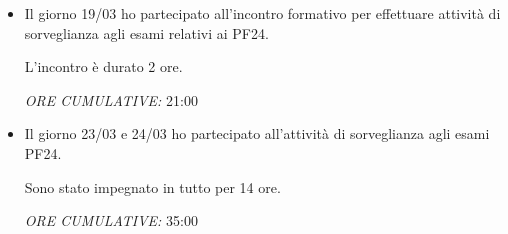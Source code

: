 \documentclass[11pt]{article}
\newcommand{\question}[1] %
{
\refstepcounter{questions} %
\par\noindent %
\phantomsection %
\addcontentsline{faq}{questions}{\thequestions - #1} %
\todo[inline, color=gray!40]{\thequestions - \textbf{#1}} %
\vspace{1em} %
}
\begin{document}
\begin{itemize}
	\item Il giorno 19/03 ho partecipato all'incontro formativo per effettuare attività di sorveglianza agli esami relativi ai PF24.
	
	L'incontro è durato 2 ore.
	
	\emph{ORE CUMULATIVE:} 21:00
	\item Il giorno 23/03 e 24/03 ho partecipato all'attività di sorveglianza agli esami PF24.
	
	Sono stato impegnato in tutto per 14 ore.
	
	\emph{ORE CUMULATIVE:} 35:00
\end{itemize}


	
%
%
%
%
%
%
%
%
%
%
%
%
%
%
%
%
\end{document}
